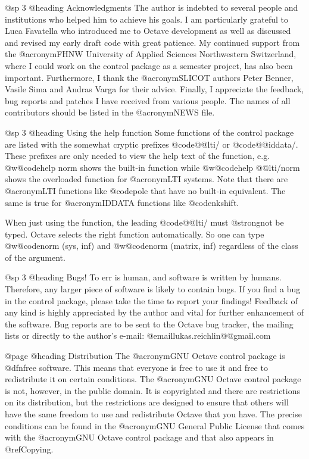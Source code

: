 @sp 3
@heading Acknowledgments
The author is indebted to several people and institutions who helped
him to achieve his goals. I am particularly grateful to Luca Favatella
who introduced me to Octave development as well as discussed and revised
my early draft code with great patience. My continued support from the
@acronym{FHNW} University of Applied Sciences Northwestern Switzerland,
where I could work on the control package as a semester project, has also
been important. Furthermore, I thank the @acronym{SLICOT} authors
Peter Benner, Vasile Sima and Andras Varga for their advice.
Finally, I appreciate the feedback, bug reports and patches I have received
from various people. The names of all contributors should be listed in the
@acronym{NEWS} file.


@sp 3
@heading Using the help function
Some functions of the control package are listed with the somewhat cryptic prefixes
@code{@@lti/} or @code{@@iddata/}. These prefixes are only needed to view the help
text of the function, e.g. @w{@code{help norm}} shows the built-in function while
@w{@code{help @@lti/norm}} shows the overloaded function for @acronym{LTI} systems.
Note that there are @acronym{LTI} functions like @code{pole} that have no built-in
equivalent. The same is true for @acronym{IDDATA} functions like @code{nkshift}.

When just using the function, the leading @code{@@lti/} must @strong{not} be typed.
Octave selects the right function automatically. So one can type @w{@code{norm (sys, inf)}}
and @w{@code{norm (matrix, inf)}} regardless of the class of the argument.


@sp 3
@heading Bugs!
To err is human, and software is written by humans.
Therefore, any larger piece of software is likely to contain bugs.
If you find a bug in the control package, please take the time
to report your findings!
Feedback of any kind is highly appreciated by the author and
vital for further enhancement of the software.
Bug reports are to be sent to the Octave bug tracker, the mailing lists
or directly to the author's e-mail: @email{lukas.reichlin@@gmail.com}


@page
@heading Distribution
The @acronym{GNU} Octave control package is @dfn{free} software.
This means that everyone is free to use it and free to redistribute it
on certain conditions.  The @acronym{GNU} Octave control package 
is not, however, in the public domain.  It is copyrighted and there are
restrictions on its distribution, but the restrictions are designed to 
ensure that others will have the same freedom to use and redistribute 
Octave that you have.  The precise conditions can be found in the 
@acronym{GNU} General Public License that comes with the @acronym{GNU}
Octave control package and that also appears in @ref{Copying}.

